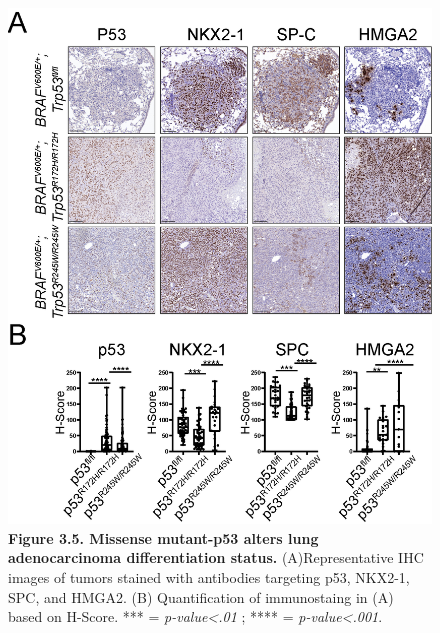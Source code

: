 \begin{figure}
\hypertarget{fig:3.5}{%
\centering
\includegraphics[width=1\textwidth,height=\textheight]{images/p53_4.png}
\caption{\textbf{Figure 3.5. Missense mutant-p53 alters lung adenocarcinoma differentiation status.} (A)Representative IHC images of tumors stained with antibodies targeting p53, NKX2-1, SPC, and HMGA2. (B) Quantification of immunostaing in (A) based on H-Score. *** = \emph{p-value\textless.01} ; **** = \emph{p-value\textless.001}.}\label{fig:3.5}
}
\end{figure}

